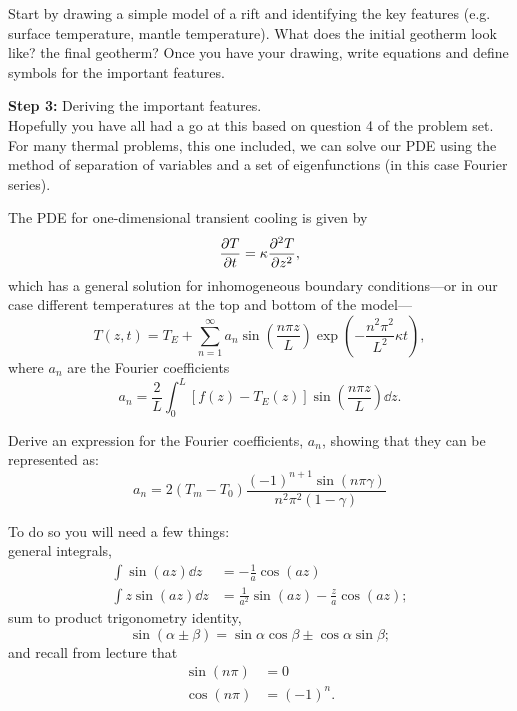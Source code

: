 \documentclass[11pt,a4paper,final]{article}
\begin{document}
\begin{enumerate}
    Start by drawing a simple model of a rift and identifying the key features (e.g.
    surface temperature, mantle temperature).  What does the initial geotherm look
    like? the final geotherm?  Once you have your drawing, write equations and
    define symbols for the important features.


    \vspace{1em}
    {\bf Step 3:} Deriving the important features. \\
    Hopefully you have all had a go at this based on question 4 of the problem set.
    For many thermal problems, this one included, we can solve our PDE using the
    method of separation of variables and a set of eigenfunctions (in this case
    Fourier series).

    The PDE for one-dimensional transient cooling is given by
    \begin{equation}
        \pdv{T}{t} = \kappa \pdv[2]{T}{z} ,
    \end{equation}
    which has a general solution for inhomogeneous boundary conditions---or in our
    case different temperatures at the top and bottom of the model---
    \begin{equation}
        T(z,t) = T_{E} + \sum_{n = 1}^{\infty} a_n \sin \left(\frac{n \pi z}{L} \right)
        \exp \left(-\frac{n^2 \pi^2}{L^2} \kappa t \right) ,
    \end{equation}
    where $a_n$ are the Fourier coefficients
    \begin{equation}
        a_n = \frac{2}{L} \int_0^{L} [f(z) - T_E(z)] \sin \left(\frac{n \pi z}{L}
        \right) \dd{z} .
    \end{equation}

    Derive an expression for the Fourier coefficients, $a_n$, showing that they can be represented as:
    \begin{equation}
        a_n = 2 (T_m - T_0) 
            \frac{ (-1)^{n+1} \sin(n \pi \gamma) } {n^2 \pi^2 (1 - \gamma)}
    \end{equation}
    
    To do so you will need a
    few things:\\
    general integrals,
    \begin{align}
        \int \sin (a z) \dd{z} &=  - \frac{1}{a} \cos (a z) \\
        \int z \sin (a z) \dd{z} &=  \frac{1}{a^2} \sin (a z) - \frac{z}{a} \cos (a z);
    \end{align}
    sum to product trigonometry identity,
    \begin{equation}
        \sin(\alpha \pm \beta) = \sin \alpha \cos \beta \pm \cos \alpha \sin \beta;
    \end{equation}
    and recall from lecture that
    \begin{align}
        \sin (n \pi) &= 0 \\
        \cos (n \pi) &= (-1)^n .
    \end{align}


\end{enumerate}
\end{document}
